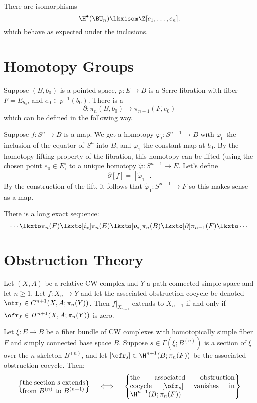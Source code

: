 \begin{proposition}
	There are isomorphisms
	\[
		\H^\bullet(\BU_n) \lkxisom \Z[c_1, \ldots, c_n].
	\]
	which behave as expected under the inclusions.
\end{proposition}

\section{Homotopy Groups}

Suppose $(B, b_0)$ is a pointed space, $p : E \to B$ is a Serre fibration with fiber $F=E_{b_0}$, and $e_0\in p^{-1}(b_0)$. There is a 
\[
	\partial : \pi_n(B, b_0) \to \pi_{n-1}(F, e_0)
\]
which can be defined in the following way.

Suppose $f : S^n \to B$ is a map. We get a homotopy $\varphi_t : S^{n-1} \to B$ with $\varphi_0$ the inclusion of the equator of $S^n$ into $B$, and $\varphi_1$ the constant map at $b_0$. By the homotopy lifting property of the fibration, this homotopy can be lifted (using the chosen point $e_0\in E$) to a unique homotopy $\widetilde{\varphi} : S^{n-1} \to E$. Let's define
\[
	\partial [f] = [\widetilde{\varphi}_1].
\]
By the construction of the lift, it follows that $\widetilde{\varphi}_1 : S^{n-1} \to F$ so this makes sense as a map.

\begin{theorem}
	There is a long exact sequence:
	\[
		\cdots\lkxto \pi_n(F)\lkxto[i_*]\pi_n(E)\lkxto[p_*]\pi_n(B)\lkxto[\partial]\pi_{n-1}(F)\lkxto\cdots
	\]
\end{theorem}

\section{Obstruction Theory}

\begin{theorem}
	Let $(X,A)$ be a relative CW complex and $Y$ a path-connected simple space and let $n\geq 1$. Let $f : X_n \to Y$ and let the associated obstruction cocycle be denoted $\ofr_f \in C^{n+1}(X, A; \pi_n(Y))$. Then $f|_{X_{n-1}}$ extends to $X_{n+1}$ if and only if $\ofr_f\in H^{n+1}(X, A; \pi_n(Y))$ is zero.
\end{theorem}

\begin{theorem}
	Let $\xi : E \to B$ be a fiber bundle of CW complexes with homotopically simple fiber $F$ and simply connected base space $B$. Suppose $s\in \Gamma(\xi; B^{(n)})$ is a section of $\xi$ over the $n$-skeleton $B^{(n)}$, and let $[\ofr_s]\in \H^{n+1}(B;\pi_n(F))$ be the associated obstruction cocycle. Then:
	\[
	\left\{ \parbox{9em}{the section $s$ extends from $B^{(n)}$ to $B^{(n+1)}$}\right\} \quad\iff\quad
	\left\{\parbox{15em}{the associated obstruction cocycle $[\ofr_s]$ vanishes in $\H^{n+1}(B; \pi_n(F))$}\right\}
	\]
\end{theorem}

